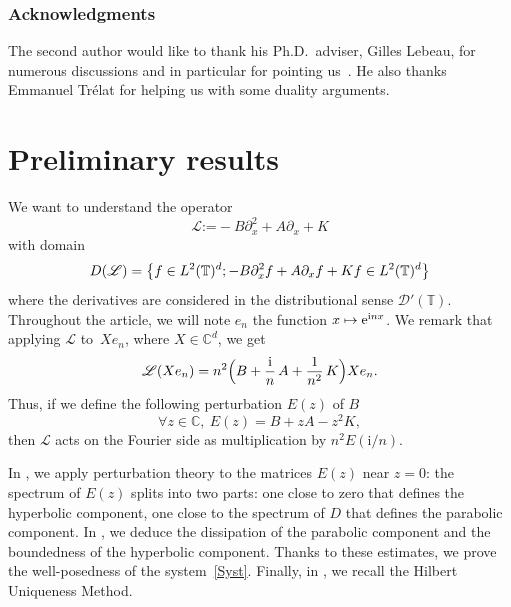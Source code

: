 \documentclass[JEP,XML,SOM,Unicode,NoEqCountersInSection]{cedram}
\let\mathcal\mathscr
\def\mto{\mathchoice{\longmapsto}{\mapsto}{\mapsto}{\mapsto}}
\theoremstyle{plain}
\theoremstyle{definition}
\theoremstyle{remark}
\newcommand{\set}{\mathbb}
\renewcommand{\C}{\set{C}}
\newcommand{\T}{\set{T}}
\newcommand{\coloneqq}{\mathrel{\mathord{:}\mathord=}}
\newcommand{\eu}{\mathrm e}
\newcommand{\iu}{\mathrm i}
\let\originalleft\left
\let\originalright\right
\renewcommand{\left}{\mathopen{}\mathclose\bgroup\originalleft}
\renewcommand{\right}{\aftergroup\egroup\originalright}
\begin{document}
\subsubsection*{Acknowledgments}
The second author would like to thank his Ph.D.\ adviser, Gilles Lebeau, for numerous discussions and in particular for pointing us~\cite{lebeau_1998}. He also thanks Emmanuel Trélat for helping us with some duality arguments.

\section{Preliminary results} \label{Sec:Prel}

We want to understand the operator\vspace*{-3pt}
\begin{equation} \label{defL}
\mathcal{L} \coloneqq -B\partial_{x}^2 + A \partial_{x} + K
\end{equation}
with domain\vspace*{-3pt}\enlargethispage{\baselineskip}%
\begin{equation} \label{def:D(L)}
D(\mathcal{L})=\left\{ f \in L^2(\T)^d ; -B\partial_{x}^2f + A \partial_{x}f + K f \in L^2(\T)^d \right\}
\end{equation}
where the derivatives are considered in the distributional sense $\mathcal{D}'(\T)$.
Throughout the article, we will note $e_n$ the function $x\mto \eu^{\iu nx}$.
We remark that applying $\mathcal L$ to~$X e_n$, where $X \in \C^{d}$, we get\vspace*{-3pt}
\begin{equation}
\label{FourierOp}
\mathcal L (X e_n) = n^{2}\Bigl(B +\frac{\iu}{n}\, A + \frac{1}{n^{2}}\,K\Bigr)X e_n.
\end{equation}
Thus, if we define the following perturbation $E(z)$ of $B$\vspace*{-3pt}
\begin{equation}
\label{defBh}
\forall z \in \C,\ E(z) = B + z A - z^{2} K,
\end{equation}
then $\mathcal L$ acts on the Fourier side as multiplication by $n^2E(\iu /n)$.

In , we apply perturbation theory to the matrices $E(z)$ near $z=0$: the spectrum of $E(z)$ splits into two parts: one close to zero that defines the hyperbolic component, one close to the spectrum of $D$ that defines the parabolic component. In , we deduce the dissipation of the parabolic component and the boundedness of the hyperbolic component. Thanks to these estimates, we prove the well-posedness of the system~\eqref{Syst}. Finally, in , we recall the Hilbert Uniqueness Method.
\end{document}
